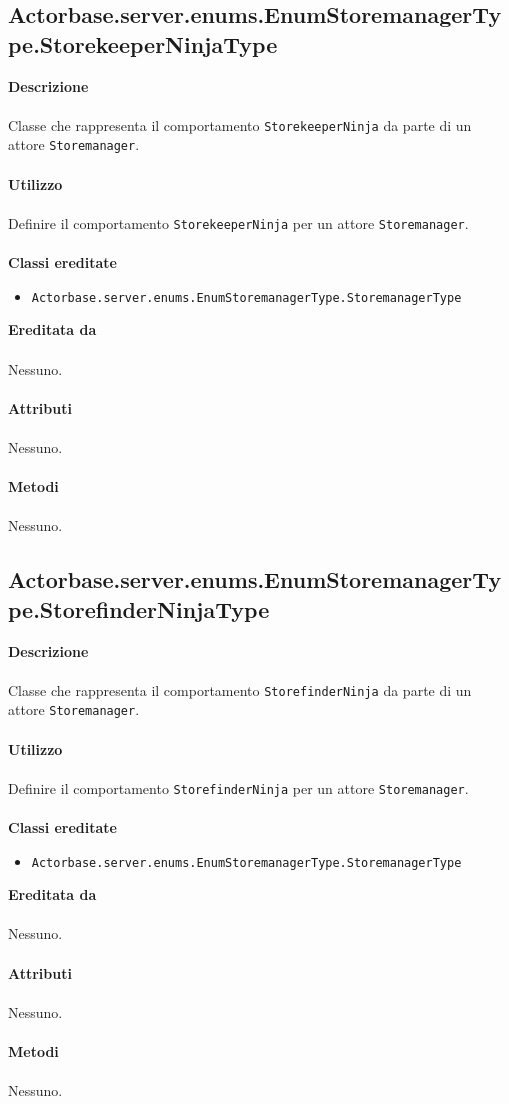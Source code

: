 \documentclass[a4paper]{article}
\begin{document}
			\subsection{Actorbase.server.enums.EnumStoremanagerType.StorekeeperNinjaType}
		\textbf{Descrizione}
			\\ \\
			Classe che rappresenta il comportamento \texttt{StorekeeperNinja} da parte di un attore \texttt{Storemanager}.
			\\ \\
		\textbf{Utilizzo}
			\\ \\
			Definire il comportamento \texttt{StorekeeperNinja} per un attore \texttt{Storemanager}.
			\\ \\
		\textbf{Classi ereditate}
			\begin{itemize}
				\item \texttt{Actorbase.server.enums.EnumStoremanagerType.StoremanagerType}
			\end{itemize}
		\textbf{Ereditata da}
		\\ \\
		Nessuno.
		\\ \\
		\textbf{Attributi}
		\\ \\
			Nessuno.
		\\ \\
		\textbf{Metodi}
			\\ \\
			Nessuno.
			
			\subsection{Actorbase.server.enums.EnumStoremanagerType.StorefinderNinjaType}
		\textbf{Descrizione}
			\\ \\
			Classe che rappresenta il comportamento \texttt{StorefinderNinja} da parte di un attore \texttt{Storemanager}.
			\\ \\
		\textbf{Utilizzo}
			\\ \\
			Definire il comportamento \texttt{StorefinderNinja} per un attore \texttt{Storemanager}.
			\\ \\
		\textbf{Classi ereditate}
			\begin{itemize}
				\item \texttt{Actorbase.server.enums.EnumStoremanagerType.StoremanagerType}
			\end{itemize}
		\textbf{Ereditata da}
		\\ \\
		Nessuno.
		\\ \\
		\textbf{Attributi}
		\\ \\
			Nessuno.
		\\ \\
		\textbf{Metodi}
			\\ \\
			Nessuno.	
			
\end{document}
